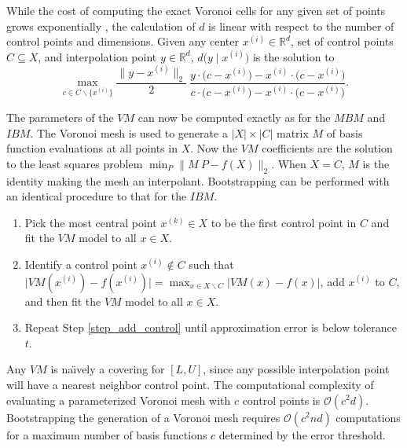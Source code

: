 While the cost of computing the exact Voronoi cells for any given set of points grows exponentially \cite{dutour2009complexity}, the calculation of $d$ is linear with respect to the number of control points and dimensions. Given any center $x^{(i)} \in \mathbb{R}^d$, set of control points $C \subseteq X$, and interpolation point $y \in \mathbb{R}^d$, $d\bigl(y \mid x^{(i)}\bigr)$ is the solution to
\begin{equation}
  \max_{c \in C\backslash\{x^{(i)}\}} \frac{\bigl\|y - x^{(i)}\bigr\|_2}{2} \ \frac{y \cdot \bigl(c - x^{(i)}\bigr) - x^{(i)} \cdot \bigl(c - x^{(i)}\bigr)}{c \cdot \bigl(c - x^{(i)}\bigr) - x^{(i)} \cdot \bigl(c - x^{(i)}\bigr)}.
\end{equation}

The parameters of the $VM$ can now be computed exactly as for the $MBM$ and $IBM$. The Voronoi mesh is used to generate a $|X| \times |C|$ matrix $M$ of basis function evaluations at all points in $X$. Now the $VM$ coefficients are the solution to the least squares problem $\min_P \bigl\| M \ P - f(X) \bigr\|_2$. When $X = C$, $M$ is the identity making the mesh an interpolant. Bootstrapping can be performed with an identical procedure to that for the $IBM$.
\begin{enumerate}
\item Pick the most central point $x^{(k)} \in X$ to be the first control point in $C$ and fit the $VM$ model to all $x \in X$.
\item Identify a control point $x^{(i)} \notin C$ such that $\bigl| VM(x^{(i)}) - f(x^{(i)}) \bigr| = \max_{x \in X \backslash C} \bigl| VM(x) - f(x) \bigr|$, add $x^{(i)}$ to $C$, and then fit the $VM$ model to all $x \in X$. \label{step_add_control}
\item Repeat Step \ref{step_add_control} until approximation error is below tolerance $t$.
\end{enumerate}

Any $VM$ is na\"{\i}vely a covering for $[L,U]$, since any possible interpolation point will have a nearest neighbor control point. The computational complexity of evaluating a parameterized Voronoi mesh with $c$ control points is $\mathcal{O}(c^2 d)$. Bootstrapping the generation of a Voronoi mesh requires $\mathcal{O}(c^2 n d)$ computations for a maximum number of basis functions $c$ determined by the error threshold.


